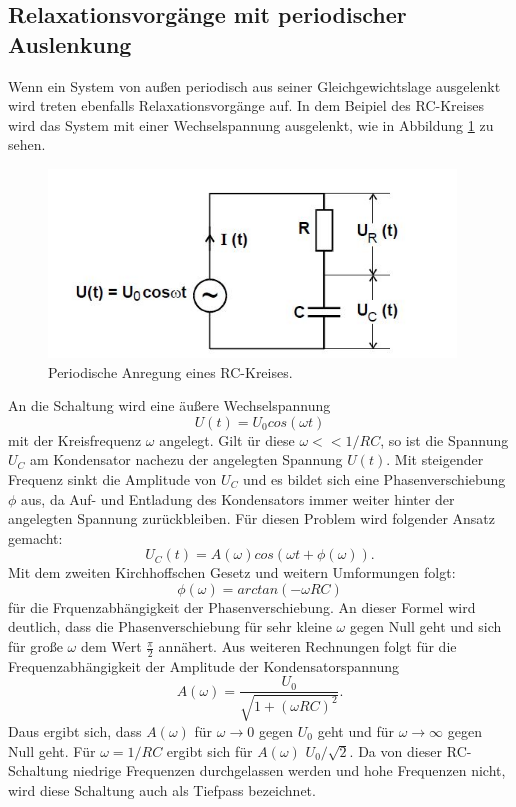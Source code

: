 \subsection{Relaxationsvorgänge mit periodischer Auslenkung}
Wenn ein System von außen periodisch aus seiner Gleichgewichtslage ausgelenkt wird
treten ebenfalls Relaxationsvorgänge auf. In dem Beipiel des RC-Kreises wird
das System mit einer Wechselspannung ausgelenkt, wie in Abbildung \ref{fig:RCsin}
zu sehen.
\begin{figure}[H]
  \centering
  \includegraphics[height=5cm]{RCsin.JPG}
  \caption{Periodische Anregung eines RC-Kreises.}
  \label{fig:RCsin}
\end{figure}
An die Schaltung wird eine äußere Wechselspannung
\begin{equation}
  U(t)=U_{0}cos(\omega t)
\end{equation}
mit der Kreisfrequenz $\omega$ angelegt. Gilt ür diese $\omega<<1/RC$, so ist
die Spannung $U_{C}$ am Kondensator nachezu der angelegten Spannung $U(t)$.
Mit steigender Frequenz sinkt die Amplitude von $U_{C}$ und es bildet sich eine
Phasenverschiebung $\phi$ aus, da Auf- und Entladung des Kondensators immer weiter
hinter der angelegten Spannung zurückbleiben.
Für diesen Problem wird folgender Ansatz gemacht:
\begin{equation}
  U_{C}(t)=A(\omega)cos(\omega t + \phi(\omega)).
\end{equation}
Mit dem zweiten Kirchhoffschen Gesetz und weitern Umformungen folgt:
\begin{equation}
  \phi(\omega)= arctan(-\omega RC)
  \label{eqn:phi}
\end{equation}
für die Frquenzabhängigkeit der Phasenverschiebung.
An dieser Formel wird deutlich, dass die Phasenverschiebung für sehr kleine
$\omega$ gegen Null geht und sich für große $\omega$ dem Wert $\frac{\pi}{2}$
annähert.
Aus weiteren Rechnungen folgt für die Frequenzabhängigkeit der Amplitude der
Kondensatorspannung
\begin{equation}
  A(\omega)=\frac{U_{0}}{\sqrt{1+(\omega RC)^2}}.
  \label{eqn:amplitude}
\end{equation}
Daus ergibt sich, dass $A(\omega)$ für $\omega \to 0$ gegen $U_{0}$ geht und
für $\omega \to \infty$ gegen Null geht. Für $\omega = 1/RC$ ergibt sich für $A(\omega)$
$U_{0}/\sqrt{2}$.
Da von dieser RC-Schaltung niedrige Frequenzen durchgelassen werden und
hohe Frequenzen nicht, wird diese Schaltung auch als Tiefpass bezeichnet.
